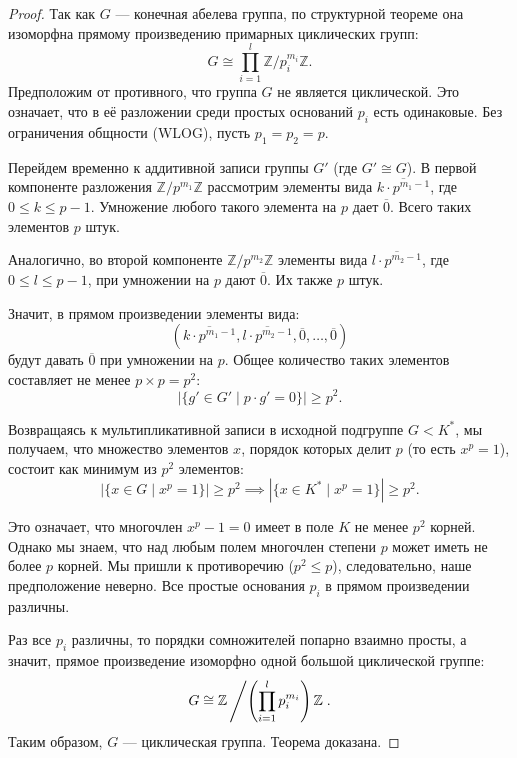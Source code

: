 \begin{proof}
	Так как $G$ --- конечная абелева группа, по структурной теореме она изоморфна прямому произведению примарных циклических групп:
	\[
	G \cong \prod_{i=1}^l \mathbb{Z}/p_i^{m_i}\mathbb{Z}.
	\]
	Предположим от противного, что группа $G$ не является циклической. Это означает, что в её разложении среди простых оснований $p_i$ есть одинаковые. Без ограничения общности (WLOG), пусть $p_1 = p_2 = p$.
	
	Перейдем временно к аддитивной записи группы $G'$ (где $G' \cong G$).
	В первой компоненте разложения $\mathbb{Z}/p^{m_1}\mathbb{Z}$ рассмотрим элементы вида $\overline{k \cdot p^{m_1-1}}$, где $0 \le k \le p-1$. Умножение любого такого элемента на $p$ дает $\overline{0}$. Всего таких элементов $p$ штук.
	
	Аналогично, во второй компоненте $\mathbb{Z}/p^{m_2}\mathbb{Z}$ элементы вида $\overline{l \cdot p^{m_2-1}}$, где $0 \le l \le p-1$, при умножении на $p$ дают $\overline{0}$. Их также $p$ штук.
	
	Значит, в прямом произведении элементы вида:
	\[
	(\overline{k \cdot p^{m_1-1}}, \overline{l \cdot p^{m_2-1}}, \overline{0}, \dots, \overline{0})
	\]
	будут давать $\overline{0}$ при умножении на $p$. Общее количество таких элементов составляет не менее $p \times p = p^2$:
	\[
	\left| \{ g' \in G' \mid p \cdot g' = 0 \} \right| \ge p^2.
	\]
	
	Возвращаясь к мультипликативной записи в исходной подгруппе $G < K^*$, мы получаем, что множество элементов $x$, порядок которых делит $p$ (то есть $x^p = 1$), состоит как минимум из $p^2$ элементов:
	\[
	\left| \{ x \in G \mid x^p = 1 \} \right| \ge p^2 \implies \left| \{ x \in K^* \mid x^p = 1 \} \right| \ge p^2.
	\]
	
	Это означает, что многочлен $x^p - 1 = 0$ имеет в поле $K$ не менее $p^2$ корней. Однако мы знаем, что над любым полем многочлен степени $p$ может иметь не более $p$ корней.
	Мы пришли к противоречию ($p^2 \le p$), следовательно, наше предположение неверно. Все простые основания $p_i$ в прямом произведении различны.
	
	Раз все $p_i$ различны, то порядки сомножителей попарно взаимно просты, а значит, прямое произведение изоморфно одной большой циклической группе:
	\[
	G \cong \mathbb{Z} \left/ \left( \prod_{i=1}^l p_i^{m_i} \right) \mathbb{Z} \right..
	\]
	Таким образом, $G$ --- циклическая группа. Теорема доказана.
\end{proof}